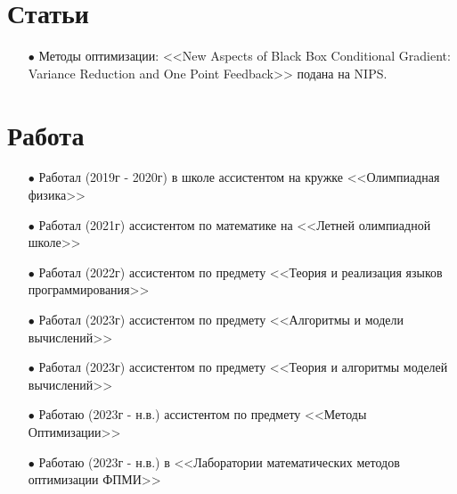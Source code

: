 \documentclass[a4paper,12pt]{article}
\begin{document}
\section*{Статьи}

    \begin{enumerate}

        \item[$\bullet$] Методы оптимизации: <<New Aspects of Black Box Conditional Gradient: Variance Reduction and One Point Feedback>> подана на NIPS.

    \end{enumerate}

\section*{Работа}

    \begin{enumerate}

        \item[$\bullet$]  Работал (2019г - 2020г) в школе ассистентом на кружке <<Олимпиадная физика>>

        \item[$\bullet$] Работал (2021г) ассистентом по математике на <<Летней олимпиадной школе>>

        \item[$\bullet$] Работал (2022г) ассистентом по предмету <<Теория и реализация языков программирования>>

        \item[$\bullet$] Работал (2023г) ассистентом по предмету <<Алгоритмы и модели вычислений>>

        \item[$\bullet$] Работал (2023г) ассистентом по предмету <<Теория и алгоритмы моделей вычислений>>
        
        \item[$\bullet$] Работаю (2023г - н.в.) ассистентом по предмету <<Методы Оптимизации>>
        
        \item[$\bullet$] Работаю (2023г - н.в.) в <<Лаборатории математических методов оптимизации ФПМИ>>
        
    \end{enumerate}
\end{document}
